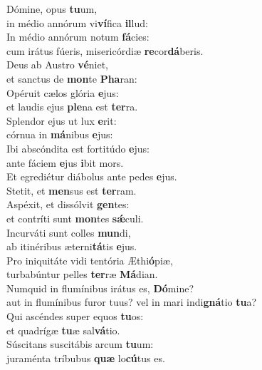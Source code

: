 \evenverse Dómine, opus \textbf{tu}um,~\*\\
\evenverse in médio annórum vi\textbf{ví}fica \textbf{il}lud:\\
\oddverse In médio annórum notum \textbf{fá}cies:~\*\\
\oddverse cum irátus fúeris, misericórdiæ \textbf{re}cor\textbf{dá}beris.\\
\evenverse Deus ab Austro \textbf{vé}niet,~\*\\
\evenverse et sanctus de \textbf{mon}te \textbf{Pha}ran:\\
\oddverse Opéruit cælos glória \textbf{e}jus:~\*\\
\oddverse et laudis ejus \textbf{ple}na est \textbf{ter}ra.\\
\evenverse Splendor ejus ut lux \textbf{e}rit:~\*\\
\evenverse córnua in \textbf{má}nibus \textbf{e}jus:\\
\oddverse Ibi abscóndita est fortitúdo \textbf{e}jus:~\*\\
\oddverse ante fáciem \textbf{e}jus \textbf{i}bit mors.\\
\evenverse Et egrediétur diábolus ante pedes \textbf{e}jus.~\*\\
\evenverse Stetit, et \textbf{men}sus est \textbf{ter}ram.\\
\oddverse Aspéxit, et dissólvit \textbf{gen}tes:~\*\\
\oddverse et contríti sunt \textbf{mon}tes \textbf{sǽ}culi.\\
\evenverse Incurváti sunt colles \textbf{mun}di,~\*\\
\evenverse ab itinéribus æterni\textbf{tá}tis \textbf{e}jus.\\
\oddverse Pro iniquitáte vidi tentória Æthi\textbf{ó}piæ,~\*\\
\oddverse turbabúntur pelles \textbf{ter}ræ \textbf{Má}dian.\\
\evenverse Numquid in flumínibus irátus es, \textbf{Dó}mine?~\*\\
\evenverse aut in flumínibus furor tuus? vel in mari indi\textbf{gná}tio \textbf{tu}a?\\
\oddverse Qui ascéndes super equos \textbf{tu}os:~\*\\
\oddverse et quadrígæ \textbf{tu}æ sal\textbf{vá}tio.\\
\evenverse Súscitans suscitábis arcum \textbf{tu}um:~\*\\
\evenverse juraménta tríbubus \textbf{quæ} lo\textbf{cú}tus es.\\
